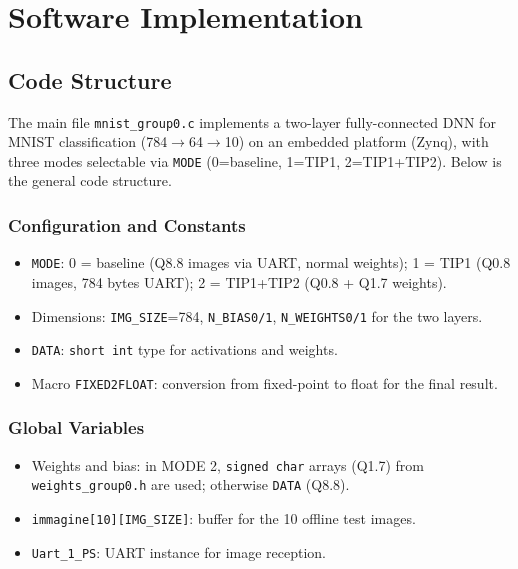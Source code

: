 \documentclass[11pt,a4paper]{article}
\begin{document}
\section{Software Implementation}

\subsection{Code Structure}

The main file \texttt{mnist\_group0.c} implements a two-layer fully-connected DNN for MNIST classification (784$\rightarrow$64$\rightarrow$10) on an embedded platform (Zynq), with three modes selectable via \texttt{MODE} (0=baseline, 1=TIP1, 2=TIP1+TIP2). Below is the general code structure.

\subsubsection{Configuration and Constants}
\begin{itemize}
    \item \texttt{MODE}: 0 = baseline (Q8.8 images via UART, normal weights); 1 = TIP1 (Q0.8 images, 784 bytes UART); 2 = TIP1+TIP2 (Q0.8 + Q1.7 weights).
    \item Dimensions: \texttt{IMG\_SIZE}=784, \texttt{N\_BIAS0/1}, \texttt{N\_WEIGHTS0/1} for the two layers.
    \item \texttt{DATA}: \texttt{short int} type for activations and weights.
    \item Macro \texttt{FIXED2FLOAT}: conversion from fixed-point to float for the final result.
\end{itemize}

\subsubsection{Global Variables}
\begin{itemize}
    \item Weights and bias: in MODE 2, \texttt{signed char} arrays (Q1.7) from \texttt{weights\_group0.h} are used; otherwise \texttt{DATA} (Q8.8).
    \item \texttt{immagine[10][IMG\_SIZE]}: buffer for the 10 offline test images.
    \item \texttt{Uart\_1\_PS}: UART instance for image reception.
\end{itemize}
\end{document}
